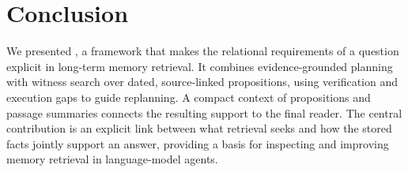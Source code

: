 \section{Conclusion}
\label{sec:conclusion}

We presented \sys, a framework that makes the relational requirements
of a question explicit in long-term memory retrieval. It combines
evidence-grounded planning with witness search over dated, source-linked
propositions, using verification and execution gaps to guide
replanning. A compact context of propositions and passage summaries
connects the resulting support to the final reader. The central
contribution is an explicit link between what retrieval seeks and
how the stored facts jointly support an answer, providing a basis
for inspecting and improving memory retrieval in language-model agents.
